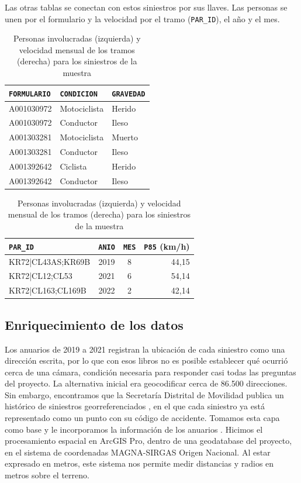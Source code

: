 \documentclass[10pt,a4paper]{article}
\begin{document}
Las otras tablas se conectan con estos siniestros por sus llaves. Las personas se unen por el formulario y la velocidad por el tramo (\texttt{PAR\_ID}), el año y el mes.

\begin{table}[H]\centering\small
\begin{tabular}[t]{lll}
\toprule
\texttt{FORMULARIO} & \texttt{CONDICION} & \texttt{GRAVEDAD}\\
\midrule
A001030972 & Motociclista & Herido\\
A001030972 & Conductor & Ileso\\
A001303281 & Motociclista & Muerto\\
A001303281 & Conductor & Ileso\\
A001392642 & Ciclista & Herido\\
A001392642 & Conductor & Ileso\\
\bottomrule
\end{tabular}\hfill
\begin{tabular}[t]{lccr}
\toprule
\texttt{PAR\_ID} & \texttt{ANIO} & \texttt{MES} & \texttt{P85} (km/h)\\
\midrule
KR72|CL43AS;KR69B & 2019 & 8 & 44,15\\
KR72|CL12;CL53 & 2021 & 6 & 54,14\\
KR72|CL163;CL169B & 2022 & 2 & 42,14\\
\bottomrule
\end{tabular}
\caption{Personas involucradas (izquierda) y velocidad mensual de los tramos (derecha) para los siniestros de la muestra}
\end{table}

\subsection{Enriquecimiento de los datos}

Los anuarios de 2019 a 2021 registran la ubicación de cada siniestro como una dirección escrita, por lo que con esos libros no es posible establecer qué ocurrió cerca de una cámara, condición necesaria para responder casi todas las preguntas del proyecto. La alternativa inicial era geocodificar cerca de 86.500 direcciones. Sin embargo, encontramos que la Secretaría Distrital de Movilidad publica un histórico de siniestros georreferenciados \cite{historico}, en el que cada siniestro ya está representado como un punto con su código de accidente. Tomamos esta capa como base y le incorporamos la información de los anuarios \cite{anuarios}. Hicimos el procesamiento espacial en ArcGIS Pro, dentro de una geodatabase del proyecto, en el sistema de coordenadas MAGNA-SIRGAS Origen Nacional. Al estar expresado en metros, este sistema nos permite medir distancias y radios en metros sobre el terreno.
\end{document}
